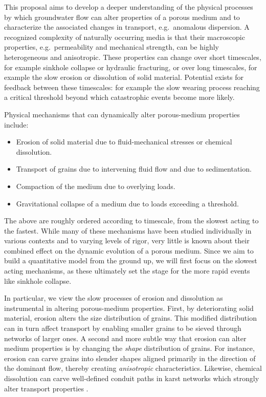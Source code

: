 \documentclass[11pt]{article}
\begin{document}
	This proposal aims to develop a deeper understanding of the physical processes by which groundwater flow can alter properties of a porous medium and to characterize the associated changes in transport, e.g.~anomalous dispersion. A recognized complexity of naturally occurring media is that their macroscopic properties, e.g.~permeability and mechanical strength, can be highly heterogeneous and anisotropic. These properties can change over short timescales, for example sinkhole collapse or hydraulic fracturing, or over long timescales, for example the slow erosion or dissolution of solid material. Potential exists for feedback between these timescales: for example the slow wearing process reaching a critical threshold beyond which catastrophic events become more likely.
	
Physical mechanisms that can dynamically alter porous-medium properties include:
\begin{itemize}
\item Erosion of solid material due to fluid-mechanical stresses or chemical dissolution.
\item Transport of grains due to intervening fluid flow and due to sedimentation.
\item Compaction of the medium due to overlying loads.
\item Gravitational collapse of a medium due to loads exceeding a threshold.
\end{itemize}
The above are roughly ordered according to timescale, from the slowest acting to the fastest. While many of these mechanisms have been studied individually in various contexts and to varying levels of rigor, very little is known about their combined effect on the dynamic evolution of a porous medium. Since we aim to build a quantitative model from the ground up, we will first focus on the slowest acting mechanisms, as these ultimately set the stage for the more rapid events like sinkhole collapse. 

In particular, we view the slow processes of erosion and dissolution as instrumental in altering porous-medium properties. First, by deteriorating solid material, erosion alters the size distribution of grains. This modified distribution can in turn affect transport by enabling smaller grains to be sieved through networks of larger ones. A second and more subtle way that erosion can alter medium properties is by changing the {\em shape} distribution of grains. For instance, erosion can carve grains into slender shapes aligned primarily in the direction of the dominant flow, thereby creating {\em anisotropic} characteristics. Likewise, chemical dissolution can carve well-defined conduit paths in karst networks which strongly alter transport properties \cite{szymczak2009wormhole}.
\end{document}

